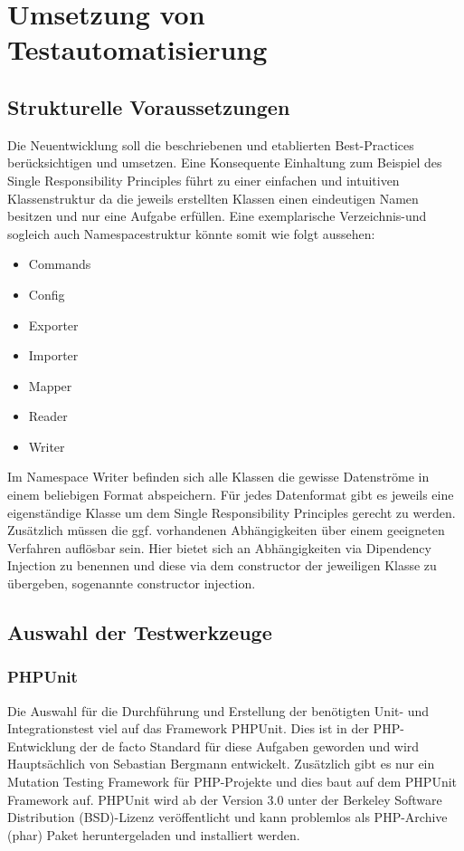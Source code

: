 \newpage
\section{Umsetzung von Testautomatisierung}\label{umsetzung}

\subsection{Strukturelle Voraussetzungen}
Die Neuentwicklung soll die beschriebenen und etablierten Best-Practices berücksichtigen und umsetzen. Eine Konsequente Einhaltung zum Beispiel des Single Responsibility Principles führt zu einer einfachen und intuitiven Klassenstruktur da die jeweils erstellten Klassen einen eindeutigen Namen besitzen und nur eine Aufgabe erfüllen. Eine exemplarische Verzeichnis-und sogleich auch Namespacestruktur könnte somit wie folgt aussehen: 

\begin{itemize}
	\item Commands
	\item Config
	\item Exporter
	\item Importer
	\item Mapper
	\item Reader
	\item Writer
\end{itemize}

Im Namespace Writer befinden sich alle Klassen die gewisse Datenströme in einem beliebigen Format abspeichern. Für jedes Datenformat gibt es jeweils eine eigenständige Klasse um dem Single Responsibility Principles gerecht zu werden. Zusätzlich müssen die ggf. vorhandenen Abhängigkeiten über einem geeigneten Verfahren auflösbar sein. Hier bietet sich an Abhängigkeiten via Dipendency Injection zu benennen und diese via dem constructor der jeweiligen Klasse zu übergeben, sogenannte constructor injection.

\subsection{Auswahl der Testwerkzeuge}
\subsubsection{PHPUnit}
Die Auswahl für die Durchführung und Erstellung der benötigten Unit- und Integrationstest viel auf das Framework PHPUnit. Dies ist in der PHP-Entwicklung der de facto Standard für diese Aufgaben geworden und wird Hauptsächlich von Sebastian Bergmann entwickelt. Zusätzlich gibt es nur ein Mutation Testing Framework für PHP-Projekte und dies baut auf dem PHPUnit Framework auf. PHPUnit wird ab der Version 3.0 unter der Berkeley Software Distribution (BSD)-Lizenz veröffentlicht und kann problemlos als PHP-Archive (phar) Paket heruntergeladen und installiert werden.

